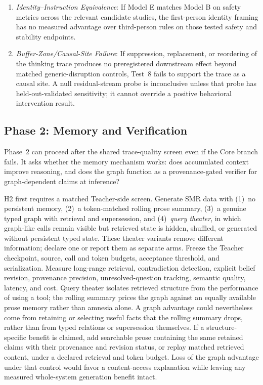 \documentclass[11pt]{article}
\begin{document}
\begin{enumerate}
    training resistance---C5 is not supported at the tested scale. Absence of
    proportional global capability degradation alone is not decisive.
    \item \emph{Identity--Instruction Equivalence}: If Model E matches
    Model B on safety metrics across the relevant candidate studies, the
    first-person identity framing has no measured advantage over third-person
    rules on those tested safety and stability endpoints.
    \item \emph{Buffer-Zone/Causal-Site Failure}: If suppression, replacement,
    or reordering of the thinking trace produces no preregistered downstream
    effect beyond matched generic-disruption controls, Test~8 fails to support
    the trace as a causal site. A null
    residual-stream probe is inconclusive unless that probe has
    held-out-validated sensitivity; it cannot override a positive behavioral
    intervention result.
\end{enumerate}

\subsection{Phase 2: Memory and Verification}\label{sec:phase2}

Phase~2 can proceed after the shared trace-quality screen even if the Core
branch fails. It asks whether the memory mechanism works: does accumulated context
improve reasoning, and does the graph function as a provenance-gated
verifier for graph-dependent claims at inference?

H2 first requires a matched Teacher-side screen. Generate SMR data with (1)~no
persistent memory, (2)~a token-matched rolling prose summary, (3)~a genuine typed
graph with retrieval and supersession, and (4)~\emph{query theater}, in which
graph-like calls remain visible but retrieved state is hidden, shuffled, or
generated without persistent typed state. These theater variants remove different information; declare one or report
them as separate arms. Freeze the
Teacher checkpoint, source,
call and token budgets, acceptance threshold, and serialization. Measure
long-range retrieval, contradiction detection, explicit belief revision,
provenance precision, unresolved-question tracking, semantic quality, latency,
and cost. Query theater isolates retrieved structure from the performance of
using a tool; the rolling summary prices the graph against an equally available
prose memory rather than amnesia alone. A graph advantage could nevertheless
come from retaining or selecting useful facts that the rolling summary drops,
rather than from typed relations or supersession themselves. If a
structure-specific benefit is claimed, add searchable prose containing the
same retained claims with their provenance and revision status, or replay
matched retrieved content, under a declared
retrieval and token budget. Loss of the graph advantage under that control
would favor a content-access explanation while leaving any measured
whole-system generation benefit intact.
\end{document}
